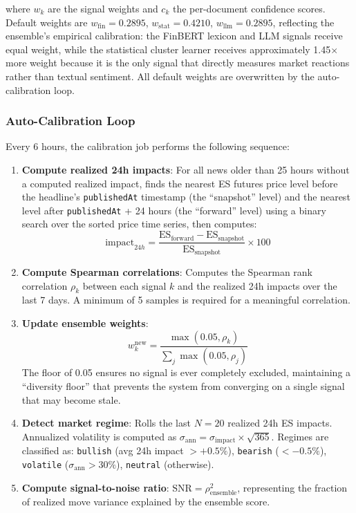 where $w_k$ are the signal weights and $c_k$ the per-document confidence scores. Default weights are $w_{\text{fin}} = 0.2895$, $w_{\text{stat}} = 0.4210$, $w_{\text{llm}} = 0.2895$, reflecting the ensemble's empirical calibration: the FinBERT lexicon and LLM signals receive equal weight, while the statistical cluster learner receives approximately 1.45$\times$ more weight because it is the only signal that directly measures market reactions rather than textual sentiment. All default weights are overwritten by the auto-calibration loop.

\subsubsection{Auto-Calibration Loop}

Every 6 hours, the calibration job performs the following sequence:

\begin{enumerate}
    \item \textbf{Compute realized 24h impacts}: For all news older than 25 hours without a computed realized impact, finds the nearest ES futures price level before the headline's \texttt{publishedAt} timestamp (the ``snapshot'' level) and the nearest level after \texttt{publishedAt} + 24 hours (the ``forward'' level) using a binary search over the sorted price time series, then computes:
    \begin{equation}
    \text{impact}_{24h} = \frac{\text{ES}_{\text{forward}} - \text{ES}_{\text{snapshot}}}{\text{ES}_{\text{snapshot}}} \times 100
    \label{eq:realized}
    \end{equation}
    \item \textbf{Compute Spearman correlations}: Computes the Spearman rank correlation $\rho_k$ between each signal $k$ and the realized 24h impacts over the last 7 days. A minimum of 5 samples is required for a meaningful correlation.
    \item \textbf{Update ensemble weights}:
    \begin{equation}
    w_k^{\text{new}} = \frac{\max(0.05, \rho_k)}{\sum_j \max(0.05, \rho_j)}
    \label{eq:weight_update}
    \end{equation}
    The floor of 0.05 ensures no signal is ever completely excluded, maintaining a ``diversity floor'' that prevents the system from converging on a single signal that may become stale.
    \item \textbf{Detect market regime}: Rolls the last $N=20$ realized 24h ES impacts. Annualized volatility is computed as $\sigma_{\text{ann}} = \sigma_{\text{impact}} \times \sqrt{365}$. Regimes are classified as: \texttt{bullish} (avg 24h impact $> +0.5\%$), \texttt{bearish} ($< -0.5\%$), \texttt{volatile} ($\sigma_{\text{ann}} > 30\%$), \texttt{neutral} (otherwise).
    \item \textbf{Compute signal-to-noise ratio}: $\text{SNR} = \rho_{\text{ensemble}}^2$, representing the fraction of realized move variance explained by the ensemble score.
\end{enumerate}

